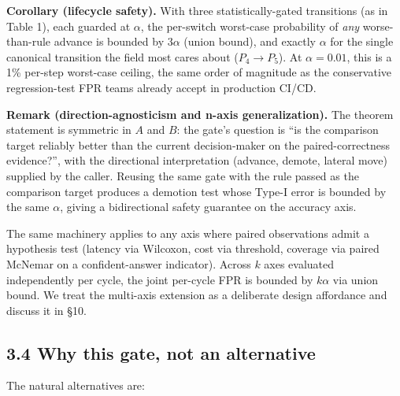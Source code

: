 \textbf{Corollary (lifecycle safety).} With three statistically-gated
transitions (as in Table 1), each guarded at \(\alpha\), the per-switch
worst-case probability of \emph{any} worse-than-rule advance is bounded
by \(3\alpha\) (union bound), and exactly \(\alpha\) for the single
canonical transition the field most cares about (\(P_4 \to P_5\)). At
\(\alpha = 0.01\), this is a 1\% per-step worst-case ceiling, the same
order of magnitude as the conservative regression-test FPR teams already
accept in production CI/CD.

\textbf{Remark (direction-agnosticism and n-axis generalization).} The
theorem statement is symmetric in \(A\) and \(B\): the gate's question
is ``is the comparison target reliably better than the current
decision-maker on the paired-correctness evidence?'', with the
directional interpretation (advance, demote, lateral move) supplied by
the caller. Reusing the same gate with the rule passed as the comparison
target produces a demotion test whose Type-I error is bounded by the
same \(\alpha\), giving a bidirectional safety guarantee on the accuracy
axis.

The same machinery applies to any axis where paired observations admit a
hypothesis test (latency via Wilcoxon, cost via threshold, coverage via
paired McNemar on a confident-answer indicator). Across \(k\) axes
evaluated independently per cycle, the joint per-cycle FPR is bounded by
\(k\alpha\) via union bound. We treat the multi-axis extension as a
deliberate design affordance and discuss it in §10.

\subsection{3.4 Why this gate, not an
alternative}\label{why-this-gate-not-an-alternative}

The natural alternatives are:

